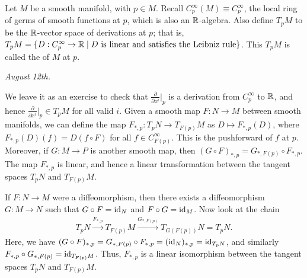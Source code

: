 \begin{definition}
    Let $M$ be a smooth manifold, with $p \in M$. Recall $C_{p}^{\infty}(M) \equiv C_{p}^{\infty}$, the local ring of germs of smooth functions at $p$, which is also an $\mathbb{R}$-algebra. Also define $T_{p}M$ to be the $\mathbb{R}$-vector space of derivations at $p$; that is, $T_{p}M = \{D:C_{p}^{\infty} \to \mathbb{R} \mid D \text{ is linear and satisfies the Leibniz rule}\}$. This $T_{p}M$ is called the  of $M$ at $p$.
\end{definition}

\noindent \textit{August 12th.}

We leave it as an exercise to check that $\frac{\partial}{\partial x^{i}}|_{p}$ is a derivation from $C_{p}^{\infty}$ to $\mathbb{R}$, and hence $\frac{\partial}{\partial x^{i}}|_{p} \in T_{p}M$ for all valid $i$. Given a smooth map $F:N \to M$ between smooth manifolds, we can define the map $F_{\ast,p}:T_{p}N \to T_{F(p)}M$ as $D \mapsto F_{\ast,p}(D)$, where $F_{\ast,p}(D)(f) = D(f \circ F)$ for all $f \in C_{F(p)}^{\infty}$. This is the pushforward of $f$ at $p$. Moreover, if $G:M \to P$ is another smooth map, then $(G \circ F)_{\ast,p} = G_{\ast,F(p)} \circ F_{\ast,p}$. The map $F_{\ast,p}$ is linear, and hence a linear transformation between the tangent spaces $T_{p}N$ and $T_{F(p)}M$.

If $F:N \to M$ were a diffeomorphism, then there exists a diffeomorphism $G:M \to N$ such that $G \circ F = \operatorname{id}_{N}$ and $F \circ G = \operatorname{id}_{M}$. Now look at the chain
\begin{align}
    T_{p}N \xrightarrow{F_{\ast,p}} T_{F(p)}M \xrightarrow{G_{\ast,F(p)}} T_{G(F(p))}N = T_{p}N.
\end{align}
Here, we have $(G \circ F)_{\ast,p} = G_{\ast,F(p)} \circ F_{\ast,p} = (\operatorname{id}_{N})_{\ast,p} = \operatorname{id}_{T_{p}N}$, and similarly $F_{\ast,p} \circ G_{\ast,F(p)} = \operatorname{id}_{T_{F(p)}M}$. Thus, $F_{\ast,p}$ is a linear isomorphism between the tangent spaces $T_{p}N$ and $T_{F(p)}M$.
\\

